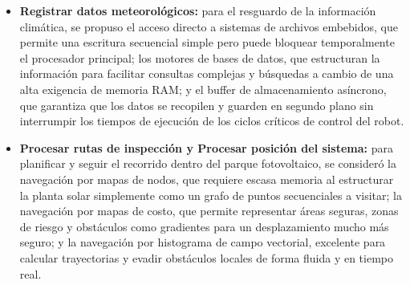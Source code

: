 \begin{itemize}
	\item \textbf{Registrar datos meteorológicos:} para el resguardo de la información climática, se propuso el acceso directo a sistemas de archivos embebidos, que permite una escritura secuencial simple pero puede bloquear temporalmente el procesador principal; los motores de bases de datos, que estructuran la información para facilitar consultas complejas y búsquedas a cambio de una alta exigencia de memoria RAM; y el buffer de almacenamiento asíncrono, que garantiza que los datos se recopilen y guarden en segundo plano sin interrumpir los tiempos de ejecución de los ciclos críticos de control del robot.
	
	\item \textbf{Procesar rutas de inspección y Procesar posición del sistema:} para planificar y seguir el recorrido dentro del parque fotovoltaico, se consideró la navegación por mapas de nodos, que requiere escasa memoria al estructurar la planta solar simplemente como un grafo de puntos secuenciales a visitar; la navegación por mapas de costo, que permite representar áreas seguras, zonas de riesgo y obstáculos como gradientes para un desplazamiento mucho más seguro; y la navegación por histograma de campo vectorial, excelente para calcular trayectorias y evadir obstáculos locales de forma fluida y en tiempo real.
\end{itemize}

